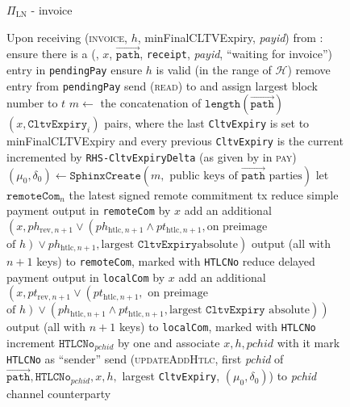 \begin{figure}[H]
\begin{protocolbox}{$\Pi_{\mathrm{LN}}$ - invoice}
\begin{algorithmic}[1]
        \State Upon receiving (\textsc{invoice}, $h$, minFinalCLTVExpiry,
        \textit{payid}) from \bob:
        \Indent
          \State ensure there is a (\bob, $x$, $\overrightarrow{\mathtt{path}}$,
          \texttt{receipt}, \textit{payid}, ``waiting for invoice'') entry in
          \texttt{pendingPay}
          \State ensure $h$ is valid (in the range of $\mathcal{H}$)
          \State remove entry from \texttt{pendingPay}
          \State send (\textsc{read}) to \ledger{} and assign largest block
          number to $t$
          \State $m \gets$ the concatenation of
          $\mathtt{length}\left(\overrightarrow{\mathtt{path}}\right)$ $\left(x,
          \mathtt{CltvExpiry}_i\right)$ pairs, where the last
          \texttt{CltvExpiry} is set to minFinalCLTVExpiry and every previous
          \texttt{CltvExpiry} is the current incremented by
          \texttt{RHS-CltvExpiryDelta} (as given by \environment{} in
          \textsc{pay})
          \label{alg:protocol:pay:invoice:cltv}
          \State $\left(\mu_0, \delta_0\right) \gets
          \mathtt{SphinxCreate}\left(m, \text{ public keys of }
          \overrightarrow{\mathtt{path}} \text{ parties}\right)$
          \State let $\mathtt{remoteCom}_n$ the latest signed remote commitment
          tx
          \State reduce simple payment output in \texttt{remoteCom} by $x$
          \State add an additional $\left(x, ph_{\mathrm{rev}, n+1} \vee
          \left(ph_{\mathrm{htlc}, n+1} \wedge pt_{\mathrm{htlc}, n+1}, \text{
          on preimage}\right.\right.$ $\left.\left.\text{of } h\right) \vee
          ph_{\mathrm{htlc}, n+1}, \text{largest } \mathtt{CltvExpiry} \text{
          absolute}\right)$ output (all with $n+1$ keys) to \texttt{remoteCom},
          marked with \texttt{HTLCNo}
          \State reduce delayed payment output in \texttt{localCom} by $x$
          \State add an additional $\left(x, pt_{\mathrm{rev}, n+1} \vee
          \left(pt_{\mathrm{htlc}, n+1}, \text{ on preimage}\right.\right.$
          $\left.\left.\text{of } h\right) \vee \left(ph_{\mathrm{htlc}, n+1}
          \wedge pt_{\mathrm{htlc}, n+1}, \text{largest } \mathtt{CltvExpiry}
          \text{ absolute}\right)\right)$ output (all with $n+1$ keys) to
          \texttt{localCom}, marked with \texttt{HTLCNo}
          \State increment $\mathtt{HTLCNo}_{\mathit{pchid}}$ by one and
          associate $x, h, \mathit{pchid}$ with it
          \State mark \texttt{HTLCNo} as ``sender''
          \State send (\textsc{updateAddHtlc}, first \textit{pchid} of
          $\overrightarrow{\mathtt{path}}, \mathtt{HTLCNo}_{\mathit{pchid}}, x,
          h,$ largest \texttt{CltvExpiry}, $\left(\mu_0,
          \delta_0\right)$) to \textit{pchid} channel counterparty
        \EndIndent
      \end{algorithmic}
    \end{protocolbox}
    \caption{}
    \label{alg:protocol:pay:invoice}
  \end{figure}

